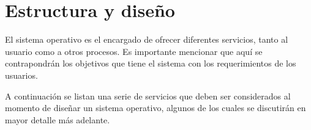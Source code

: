 %
%
%
%

\chapter{Estructura y diseño}
\label{estructura}
El sistema operativo es el encargado de ofrecer diferentes servicios, tanto al
usuario como a otros procesos. Es importante mencionar que aquí se contrapondrán
los objetivos que tiene el sistema con los requerimientos de los usuarios.

A continuación se listan una serie de servicios que deben ser considerados al
momento de diseñar un sistema operativo, algunos de los cuales se discutirán en
mayor detalle más adelante.

